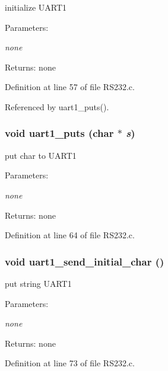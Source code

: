 initialize UART1 

\begin{Desc}
\item[Parameters:]
\begin{description}
\item[{\em none}]\end{description}
\end{Desc}
\begin{Desc}
\item[Returns:]none \end{Desc}


Definition at line 57 of file RS232.c.

Referenced by uart1\_\-puts().
\subsubsection{\setlength{\rightskip}{0pt plus 5cm}void uart1\_\-puts (char $\ast$ {\em s})}\label{_r_s232_8c_4da02067ec1624f7ecf49376d7ce1dca}


put char to UART1 

\begin{Desc}
\item[Parameters:]
\begin{description}
\item[{\em none}]\end{description}
\end{Desc}
\begin{Desc}
\item[Returns:]none \end{Desc}


Definition at line 64 of file RS232.c.
\subsubsection{\setlength{\rightskip}{0pt plus 5cm}void uart1\_\-send\_\-initial\_\-char ()}\label{_r_s232_8c_72c839f90335c8c3cb2103e11617b1b6}


put string UART1 

\begin{Desc}
\item[Parameters:]
\begin{description}
\item[{\em none}]\end{description}
\end{Desc}
\begin{Desc}
\item[Returns:]none \end{Desc}


Definition at line 73 of file RS232.c.